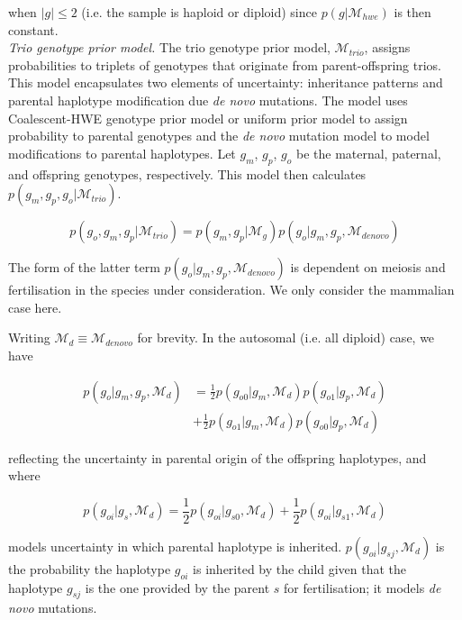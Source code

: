 \documentclass[notitlepage, twocolumn]{article}
\begin{document}
when $|g| \le 2$ (i.e. the sample is haploid or diploid) since $p(g | \mathcal{M}_{hwe})$ is then constant.\\

\emph{Trio genotype prior model.} The trio genotype prior model, $\mathcal{M}_{trio}$, assigns probabilities to triplets of genotypes that originate from parent-offspring trios. This model encapsulates two elements of uncertainty: inheritance patterns and parental haplotype modification due \textit{de novo} mutations. The model uses Coalescent-HWE genotype prior model or uniform prior model to assign probability to parental genotypes and the \emph{de novo} mutation model to model modifications to parental haplotypes. Let $g_m$, $g_p$, $g_o$ be the maternal, paternal, and offspring genotypes, respectively. This model then calculates $p(g_m, g_p, g_o | \mathcal{M}_{trio})$.

\begin{equation*}
    p(g_o, g_m, g_p | \mathcal{M}_{trio}) = p(g_m, g_p | \mathcal{M}_{g}) p(g_o | g_m, g_p, \mathcal{M}_{denovo})
\end{equation*}

The form of the latter term $p(g_o | g_m, g_p, \mathcal{M}_{denovo})$ is dependent on meiosis and fertilisation in the species under consideration. We only consider the mammalian case here.

Writing $\mathcal{M}_{d} \equiv \mathcal{M}_{denovo}$ for brevity. In the autosomal (i.e. all diploid) case, we have

\begin{align*}
    p(g_o | g_m, g_p, \mathcal{M}_{d}) &= \frac{1}{2} p(g_{o0} | g_m, \mathcal{M}_{d})p(g_{o1} | g_p, \mathcal{M}_{d}) \\ &+ \frac{1}{2} p(g_{o1} | g_m, \mathcal{M}_{d}) p(g_{o0} |g_p, \mathcal{M}_{d})
\end{align*}

reflecting the uncertainty in parental origin of the offspring haplotypes, and where

\begin{equation*}
p(g_{oi} |g_s, \mathcal{M}_{d}) = \frac{1}{2} p(g_{oi} | g_{s0}, \mathcal{M}_{d}) + \frac{1}{2} p(g_{oi} | g_{s1}, \mathcal{M}_{d})
\end{equation*}

models uncertainty in which parental haplotype is inherited. $p(g_{oi} | g_{sj}, \mathcal{M}_{d})$ is the probability the haplotype $g_{oi}$ is inherited by the child given that the haplotype $g_{sj}$ is the one provided by the parent $s$ for fertilisation; it models \textit{de novo} mutations.
\end{document}
